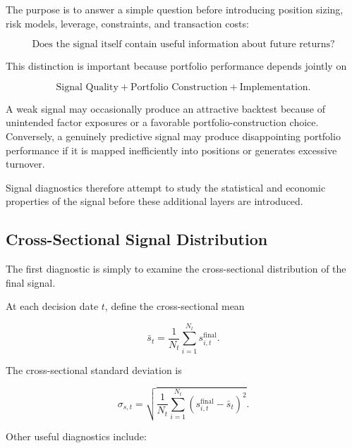 \documentclass[11pt,a4paper]{article}
\begin{document}
The purpose is to answer a simple question before introducing position sizing,
risk models, leverage, constraints, and transaction costs:

\begin{equation}
\boxed{
\text{Does the signal itself contain useful information about future returns?}
}
\end{equation}

This distinction is important because portfolio performance depends jointly on

\begin{equation}
\boxed{
\text{Signal Quality}
+
\text{Portfolio Construction}
+
\text{Implementation}.
}
\end{equation}

A weak signal may occasionally produce an attractive backtest because of
unintended factor exposures or a favorable portfolio-construction choice.
Conversely, a genuinely predictive signal may produce disappointing portfolio
performance if it is mapped inefficiently into positions or generates excessive
turnover.

Signal diagnostics therefore attempt to study the statistical and economic
properties of the signal before these additional layers are introduced.


\subsection{Cross-Sectional Signal Distribution}
\label{subsec:cross_sectional_signal_distribution}

The first diagnostic is simply to examine the cross-sectional distribution of
the final signal.

At each decision date $t$, define the cross-sectional mean

\begin{equation}
\boxed{
\bar{s}_t
=
\frac{1}{N_t}
\sum_{i=1}^{N_t}
s_{i,t}^{\mathrm{final}}.
}
\end{equation}

The cross-sectional standard deviation is

\begin{equation}
\boxed{
\sigma_{s,t}
=
\sqrt{
\frac{1}{N_t}
\sum_{i=1}^{N_t}
\left(
s_{i,t}^{\mathrm{final}}
-
\bar{s}_t
\right)^2
}.
}
\end{equation}

Other useful diagnostics include:
\end{document}
